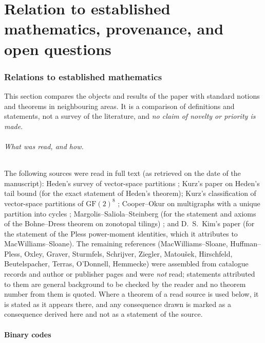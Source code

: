 \part{Relation to established mathematics, provenance, and open questions}

\section{Relations to established mathematics}\label{sec:literature}

This section compares the objects and results of the paper with standard notions and theorems in neighbouring areas. It is a comparison of definitions and statements, not a survey of the literature, and \emph{no claim of novelty or priority is made}.

\paragraph{What was read, and how.} The following sources were read in full text (as retrieved on the date of the manuscript): Heden's survey of vector-space partitions \cite{Heden2012}; Kurz's paper on Heden's tail bound \cite{KurzTail} (for the exact statement of Heden's theorem); Kurz's classification of vector-space partitions of $\mathrm{GF}(2)^8$ \cite{KurzGF28}; Cooper--Okur on multigraphs with a unique partition into cycles \cite{CooperOkur}; Margolis--Saliola--Steinberg (for the statement and axioms of the Bohne--Dress theorem on zonotopal tilings) \cite{MSS}; and D.~S.~Kim's paper \cite{Kim2009} (for the statement of the Pless power-moment identities, which it attributes to MacWilliams--Sloane). The remaining references (MacWilliams--Sloane, Huffman--Pless, Oxley, Graver, Sturmfels, Schrijver, Ziegler, Matou\v sek, Hirschfeld, Beutelspacher, Terras, O'Donnell, Hemmecke) were assembled from catalogue records and author or publisher pages and were \emph{not} read; statements attributed to them are general background to be checked by the reader and no theorem number from them is quoted. Where a theorem of a read source is used below, it is stated as it appears there, and any consequence drawn is marked as a consequence derived here and not as a statement of the source.

\subsection{Binary codes}

